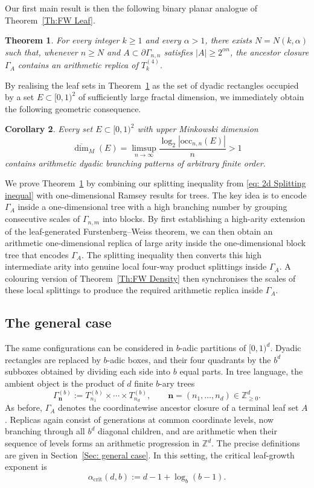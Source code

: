 \documentclass[11pt]{amsart}
\newcommand{\Z}{\mathbb{Z}}  %
\newcommand\labs[1]{\left\lvert#1\right\rvert}
\renewcommand{\geq}{\geqslant}
\theoremstyle{plain}
\newtheorem{thmAlph}{Theorem}[section]
\newtheorem{corAlph}[thmAlph]{Corollary}
\theoremstyle{definition}
\theoremstyle{remark}
\begin{document}
Our first main result is then the following binary planar analogue of Theorem~\ref{Th:FW Leaf}.
\begin{thmAlph}\label{Theorem: Arith replicas in Binary Product Tree}
For every integer $k\geq 1$ and every $\alpha>1$, there exists $N=N(k,\alpha)$ such that, whenever $n\geq N$ and $A\subset\partial\Gamma_{n,n}$ satisfies $\labs{A}\geq2^{\alpha n}$, the ancestor closure $\Gamma_A$ contains an arithmetic replica of $T_k^{(4)}$.
\end{thmAlph}

By realising the leaf sets in Theorem~\ref{Theorem: Arith replicas in Binary Product Tree} as the set of dyadic rectangles occupied by a set $E\subset [0,1)^2$ of sufficiently large fractal dimension, we immediately obtain the following geometric consequence.

\begin{corAlph}
Every set $E\subset[0,1)^2$ with upper Minkowski dimension
\[\overline{\dim}_M(E)=\limsup_{n\to\infty}\frac{\log_2\labs{\mathrm{occ}_{n,n}(E)}}{n}>1\] contains arithmetic dyadic branching patterns of arbitrary finite order.
\end{corAlph}
We prove Theorem~\ref{Theorem: Arith replicas in Binary Product Tree} by combining our splitting inequality from \eqref{eq: 2d Splitting inequal} with one-dimensional Ramsey results for trees. The key idea is to encode $\Gamma_A$ inside a one-dimensional tree with a high branching number by grouping consecutive scales of $\Gamma_{n,m}$ into blocks. By first establishing a high-arity extension of the leaf-generated Furstenberg--Weiss theorem, we can then obtain an arithmetic one-dimensional replica of large arity inside the one-dimensional block tree that encodes $\Gamma_A$. The splitting inequality then converts this high intermediate arity into genuine local four-way product splittings inside $\Gamma_A$. A colouring version of Theorem~\ref{Th:FW Density} then synchronises the scales of these local splittings to produce the required arithmetic replica inside $\Gamma_A$.
\subsection{The general case}
The same configurations can be considered in $b$-adic partitions of
$[0,1)^d$. Dyadic rectangles are replaced by $b$-adic boxes, and their
four quadrants by the $b^d$ subboxes obtained by dividing each side
into $b$ equal parts. In tree language, the ambient object is the
product of $d$ finite $b$-ary trees
\[
\Gamma_{\mathbf n}^{(b)}
:=
T_{n_1}^{(b)}\times\cdots\times T_{n_d}^{(b)},
\qquad
\mathbf n=(n_1,\ldots,n_d)\in\Z_{\geq0}^d.
\]
As before, $\Gamma_A$ denotes the coordinatewise ancestor closure
of a terminal leaf set $A$. Replicas again consist of generations
at common coordinate levels, now branching through all $b^d$
diagonal children, and are arithmetic when their sequence of levels
forms an arithmetic progression in $\Z^d$. The precise definitions
are given in Section~\ref{Sec: general case}.
In this setting, the critical leaf-growth exponent is
\begin{equation}\label{eq: Critical growth rate}
\alpha_{\mathrm{crit}}(d,b):=d-1+\log_b(b-1).
\end{equation}
\end{document}
